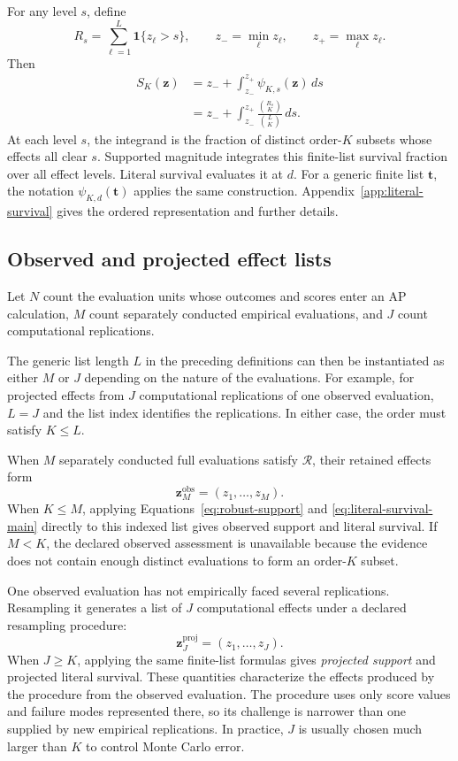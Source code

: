 \documentclass[11pt]{article}
\newcommand{\Regime}{\mathcal{R}}
\theoremstyle{remark}
\begin{document}
For any level $s$, define
\[
R_s=\sum_{\ell=1}^L\mathbf 1\{z_\ell>s\},
\qquad
z_-=\min_\ell z_\ell,
\qquad
z_+=\max_\ell z_\ell.
\]
Then
\begin{equation}
\begin{aligned}
S_K(\mathbf z)
&=
z_-
+
\int_{z_-}^{z_+}
\psi_{K,s}(\mathbf z)\,ds \\
&=
z_-
+
\int_{z_-}^{z_+}
\frac{\binom{R_s}{K}}{\binom{L}{K}}\,ds.
\end{aligned}
\label{eq:support-survival-main}
\end{equation}
At each level $s$, the integrand is the fraction of distinct order-$K$
subsets whose effects all clear $s$. Supported magnitude integrates this
finite-list survival fraction over all effect levels. Literal survival
evaluates it at $d$. For a generic finite list $\mathbf t$, the notation
$\psi_{K,d}(\mathbf t)$ applies the same construction.
Appendix~\ref{app:literal-survival} gives the ordered representation and
further details.

\subsection{Observed and projected effect lists}
\label{sec:projected}

Let $N$ count the evaluation units whose outcomes and scores enter an AP calculation, $M$ count separately conducted empirical evaluations, and $J$ count computational replications.

The generic list length $L$ in the preceding definitions can then be
instantiated as either $M$ or $J$ depending on the nature of the evaluations.
For example, for projected effects from $J$ computational replications of one
observed evaluation, $L=J$ and the list index identifies the replications. In
either case, the order must satisfy $K\leq L$.

When $M$ separately conducted full evaluations satisfy $\Regime$, their retained effects form
\[
\mathbf z_M^{\mathrm{obs}}
=
(z_1,\ldots,z_M).
\]
When $K\leq M$, applying Equations~\eqref{eq:robust-support} and
\eqref{eq:literal-survival-main} directly to this indexed list gives observed
support and literal survival. If $M<K$, the declared observed assessment is
unavailable because the evidence does not contain enough distinct evaluations
to form an order-$K$ subset.

One observed evaluation has not empirically faced several replications. Resampling it generates a list of $J$ computational effects under a declared resampling procedure:
\[
\mathbf z_J^{\mathrm{proj}}
=
(z_1,\ldots,z_J).
\]
When $J\geq K$, applying the same finite-list formulas gives
\emph{projected support} and projected literal survival. These quantities
characterize the effects produced by the procedure from the observed
evaluation. The procedure uses only score values and failure modes represented
there, so its challenge is narrower than one supplied by new empirical
replications. In practice, $J$ is usually chosen much larger than $K$ to
control Monte Carlo error.
\end{document}
